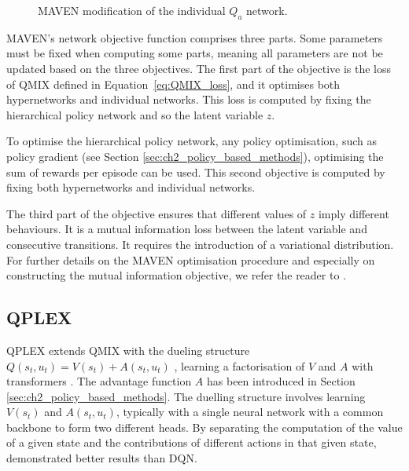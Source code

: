 \begin{figure}
\centering

\caption{MAVEN modification of the individual $Q_a$ network.}
\label{fig:maven}
\end{figure}

MAVEN's network objective function comprises three parts.
Some parameters must be fixed when computing some parts, meaning all parameters are not be updated based on the three objectives.
The first part of the objective is the loss of QMIX defined in Equation~\ref{eq:QMIX_loss}, and it optimises both hypernetworks and individual networks.
This loss is computed by fixing the hierarchical policy network and so the latent variable $z$.

To optimise the hierarchical policy network, any policy optimisation, such as policy gradient (see Section \ref{sec:ch2_policy_based_methods}), optimising the sum of rewards per episode can be used.
This second objective is computed by fixing both hypernetworks and individual networks.

The third part of the objective ensures that different values of $z$ imply different behaviours. 
It is a mutual information loss between the latent variable and consecutive transitions.
It requires the introduction of a variational distribution. 
For further details on the MAVEN optimisation procedure and especially on constructing the mutual information objective, we refer the reader to \cite{Mahajan2019MAVEN:Exploration}.

\subsection{QPLEX}
QPLEX \citep{wang2021qplex} extends QMIX with the dueling structure $Q(s_t, u_t) = V(s_t) + A(s_t, u_t)$ \citep{wang2016dueling}, learning a factorisation of $V$ and $A$ with transformers \citep{vaswani2017attention}.
The advantage function $A$ has been introduced in Section \ref{sec:ch2_policy_based_methods}.
The duelling structure involves learning $V(s_t)$ and $A(s_t, u_t)$, typically with a single neural network with a common backbone to form two different heads.
By separating the computation of the value of a given state and the contributions of different actions in that given state, \citet{wang2016dueling} demonstrated better results than DQN.

